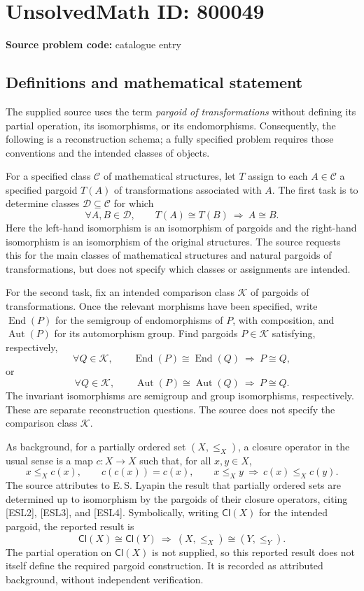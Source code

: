 \documentclass[11pt]{article}
\begin{document}
\section*{UnsolvedMath ID: 800049}
\textbf{Source problem code:} catalogue entry
\subsection{Definitions and mathematical statement}
The supplied source uses the term \emph{pargoid of transformations} without defining its partial operation, its isomorphisms, or its endomorphisms. Consequently, the following is a reconstruction schema; a fully specified problem requires those conventions and the intended classes of objects.

For a specified class \(\mathcal C\) of mathematical structures, let \(T\) assign to each \(A\in\mathcal C\) a specified pargoid \(T(A)\) of transformations associated with \(A\). The first task is to determine classes \(\mathcal D\subseteq\mathcal C\) for which
\[
\forall A,B\in\mathcal D,\qquad
T(A)\cong T(B)\ \Longrightarrow\ A\cong B.
\]
Here the left-hand isomorphism is an isomorphism of pargoids and the right-hand isomorphism is an isomorphism of the original structures. The source requests this for the main classes of mathematical structures and natural pargoids of transformations, but does not specify which classes or assignments are intended.

For the second task, fix an intended comparison class \(\mathcal K\) of pargoids of transformations. Once the relevant morphisms have been specified, write \(\operatorname{End}(P)\) for the semigroup of endomorphisms of \(P\), with composition, and \(\operatorname{Aut}(P)\) for its automorphism group. Find pargoids \(P\in\mathcal K\) satisfying, respectively,
\[
\forall Q\in\mathcal K,\qquad
\operatorname{End}(P)\cong\operatorname{End}(Q)
\ \Longrightarrow\ P\cong Q,
\]
or
\[
\forall Q\in\mathcal K,\qquad
\operatorname{Aut}(P)\cong\operatorname{Aut}(Q)
\ \Longrightarrow\ P\cong Q.
\]
The invariant isomorphisms are semigroup and group isomorphisms, respectively. These are separate reconstruction questions. The source does not specify the comparison class \(\mathcal K\).

As background, for a partially ordered set \((X,\leq_X)\), a closure operator in the usual sense is a map \(c:X\to X\) such that, for all \(x,y\in X\),
\[
x\leq_X c(x),\qquad c(c(x))=c(x),\qquad
x\leq_X y\ \Longrightarrow\ c(x)\leq_X c(y).
\]
The source attributes to E.\,S. Lyapin the result that partially ordered sets are determined up to isomorphism by the pargoids of their closure operators, citing [ESL2], [ESL3], and [ESL4]. Symbolically, writing \(\mathsf{Cl}(X)\) for the intended pargoid, the reported result is
\[
\mathsf{Cl}(X)\cong\mathsf{Cl}(Y)
\ \Longrightarrow\ (X,\leq_X)\cong(Y,\leq_Y).
\]
The partial operation on \(\mathsf{Cl}(X)\) is not supplied, so this reported result does not itself define the required pargoid construction. It is recorded as attributed background, without independent verification.
\end{document}

